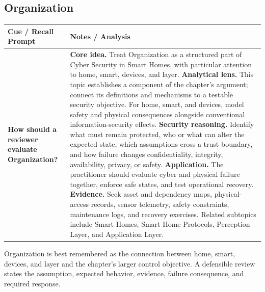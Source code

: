 \documentclass[11pt]{article}
\newcommand{\CornellHeader}{%
\rowcolor{Navy}\color{white}\bfseries Cue / Recall Prompt & \color{white}\bfseries Notes / Analysis\\\hline}
\newcommand{\CornellRow}[2]{%
\cellcolor{CueGray}\RaggedRight\textbf{#1} & \RaggedRight #2\\\hline}
\begin{document}
\subsection*{Organization}
\begin{longtable}{>{\RaggedRight\arraybackslash}p{}|>{\RaggedRight\arraybackslash}p{}}
\CornellHeader
\CornellRow{How should a reviewer evaluate Organization?}{\textbf{Core idea.} Treat Organization as a structured part of Cyber Security in Smart Homes, with particular attention to home, smart, devices, and layer. \textbf{Analytical lens.} This topic establishes a component of the chapter's argument; connect its definitions and mechanisms to a testable security objective. For home, smart, and devices, model safety and physical consequences alongside conventional information-security effects. \textbf{Security reasoning.} Identify what must remain protected, who or what can alter the expected state, which assumptions cross a trust boundary, and how failure changes confidentiality, integrity, availability, privacy, or safety. \textbf{Application.} The practitioner should evaluate cyber and physical failure together, enforce safe states, and test operational recovery. \textbf{Evidence.} Seek asset and dependency maps, physical-access records, sensor telemetry, safety constraints, maintenance logs, and recovery exercises. Related subtopics include Smart Homes, Smart Home Protocols, Perception Layer, and Application Layer.}
\end{longtable}
\begin{topicsummary}
Organization is best remembered as the connection between home, smart, devices, and layer and the chapter's larger control objective. A defensible review states the assumption, expected behavior, evidence, failure consequence, and required response.
\end{topicsummary}
\end{document}
